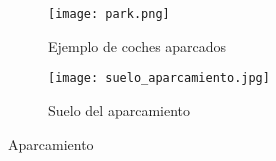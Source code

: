 \begin{figure}[h!]
  \begin{subfigure}[b]{0.4\textwidth}
    \texttt{[image: park.png]}
    \caption{Ejemplo de coches aparcados}
  \end{subfigure}
    \hfill
  \begin{subfigure}[b]{0.4\textwidth}
    \texttt{[image: suelo\_aparcamiento.jpg]}
    \caption{Suelo del aparcamiento}
  \end{subfigure}
    \hfill
\caption{Aparcamiento}
\label{fig:aparcamiento}
\end{figure}



